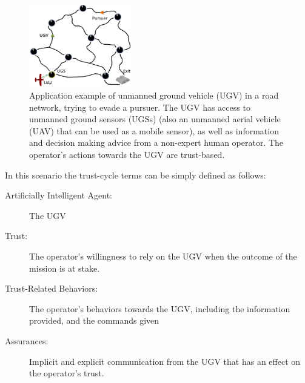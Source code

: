 	\begin{figure}[htbp]
    	\centering
     	\includegraphics[width=0.4\textwidth]{Figures/RoadNet}
    	\caption{Application example of unmanned ground vehicle (UGV) in a road network, trying to evade a pursuer. The UGV has access to unmanned ground sensors (UGSs) (also an unmanned aerial vehicle (UAV) that can be used as a mobile sensor), as well as information and decision making advice from a non-expert human operator. The operator's actions towards the UGV are trust-based.}
        \label{fig:RoadNet}
    \end{figure}

    In this scenario the trust-cycle terms can be simply defined as follows:

    \begin{description}
        \item [Artificially Intelligent Agent:] The UGV  
        \item [Trust:] The operator's willingness to rely on the UGV when the outcome of the mission is at stake. 
        \item [Trust-Related Behaviors:] The operator's behaviors towards the UGV, including the information provided, and the commands given  
        \item [Assurances:] Implicit and explicit communication from the UGV that has an effect on the operator's trust. 
    \end{description}

